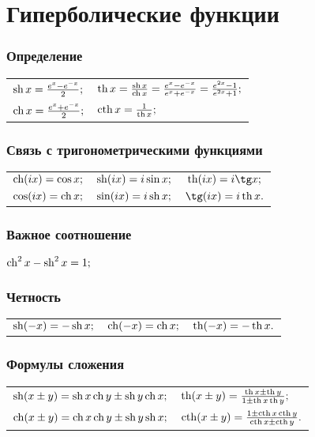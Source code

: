 \section{Гиперболические функции}

\subsubsection{Определение}
\begin{tabular}{l l}
$\sh x = \frac{e^{x}-e^{-x}}{2};$
&
$\th x = \frac{\sh x}{\ch x}=\frac{e^{x}-e^{-x}}{e^{x}+e^{-x}}=\frac{e^{2x}-1}{e^{2x}+1};$
\\
$\ch x = \frac{e^{x}+e^{-x}}{2};$
&
$\cth x = \frac{1}{\th x};$
\end{tabular}

\subsubsection{Связь с тригонометрическими функциями}
\begin{tabular}{c c c}
$\ch (ix) = \cos x;$
&
$\sh (ix)= i \sin x;$
&
$\th (ix) = i \tg x;$
\\
$\cos (ix) = \ch x;$
&
$\sin (ix) = i \sh x;$
&
$\tg (ix) = i \th x.$
\end{tabular}

\subsubsection{Важное соотношение}
$\ch^2 x - \sh^2 x = 1;$

\subsubsection{Четность}
\begin{tabular}{l l l}
$\sh (-x) = -\sh x;$
&
$\ch (-x) = \ch x;$
&
$\th (-x) = -\th x.$
\end{tabular}

\subsubsection{Формулы сложения}
\begin{tabular}{l l}
$\sh (x\pm y) =  \sh x \ch y \pm \sh y \ch x;$
&
$\th (x \pm y) = \frac{\th x \pm \th y}{1 \pm \th x \th y};$
\\
$\ch (x\pm y) =  \ch x \ch y \pm \sh y \sh x;$
&
$\cth (x \pm y) = \frac{1 \pm \cth x \cth y}{\cth x \pm \cth y}.$
\end{tabular}

